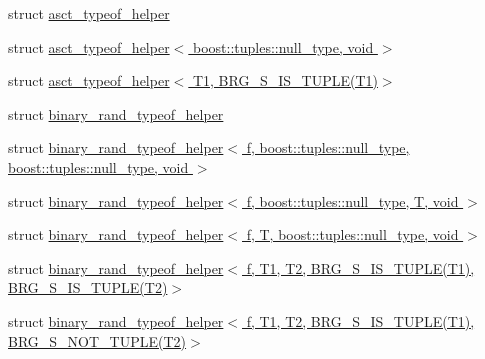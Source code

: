 \begin{DoxyCompactItemize}
\item 
struct \hyperlink{namespaceIceBRG_1_1tuples_structIceBRG_1_1tuples_1_1asct__typeof__helper}{asct\+\_\+typeof\+\_\+helper}
\item 
struct \hyperlink{namespaceIceBRG_1_1tuples_structIceBRG_1_1tuples_1_1asct__typeof__helper_3_01boost_1_1tuples_1_1null__type_00_01void_01_4}{asct\+\_\+typeof\+\_\+helper$<$ boost\+::tuples\+::null\+\_\+type, void $>$}
\item 
struct \hyperlink{namespaceIceBRG_1_1tuples_structIceBRG_1_1tuples_1_1asct__typeof__helper_3_01T1_00_01BRG__S__IS__TUPLE_07T1_08_4}{asct\+\_\+typeof\+\_\+helper$<$ T1, B\+R\+G\+\_\+\+S\+\_\+\+I\+S\+\_\+\+T\+U\+P\+L\+E(\+T1)$>$}
\item 
struct \hyperlink{namespaceIceBRG_1_1tuples_structIceBRG_1_1tuples_1_1binary__rand__typeof__helper}{binary\+\_\+rand\+\_\+typeof\+\_\+helper}
\item 
struct \hyperlink{namespaceIceBRG_1_1tuples_structIceBRG_1_1tuples_1_1binary__rand__typeof__helper_3_01f_00_01boost_1_1tuples_1_1null__type_5c02c427c306686c3b1206a9b133bf57}{binary\+\_\+rand\+\_\+typeof\+\_\+helper$<$ f, boost\+::tuples\+::null\+\_\+type, boost\+::tuples\+::null\+\_\+type, void $>$}
\item 
struct \hyperlink{namespaceIceBRG_1_1tuples_structIceBRG_1_1tuples_1_1binary__rand__typeof__helper_3_01f_00_01boost_1_1tuples_1_1null__type_00_01T_00_01void_01_4}{binary\+\_\+rand\+\_\+typeof\+\_\+helper$<$ f, boost\+::tuples\+::null\+\_\+type, T, void $>$}
\item 
struct \hyperlink{namespaceIceBRG_1_1tuples_structIceBRG_1_1tuples_1_1binary__rand__typeof__helper_3_01f_00_01T_00_01boost_1_1tuples_1_1null__type_00_01void_01_4}{binary\+\_\+rand\+\_\+typeof\+\_\+helper$<$ f, T, boost\+::tuples\+::null\+\_\+type, void $>$}
\item 
struct \hyperlink{structIceBRG_1_1tuples_1_1binary__rand__typeof__helper_3_01f_00_01T1_00_01T2_00_01BRG__S__IS__TU17fb7ccd40b5d61da5648c1c2c034d10}{binary\+\_\+rand\+\_\+typeof\+\_\+helper$<$ f, T1, T2, B\+R\+G\+\_\+\+S\+\_\+\+I\+S\+\_\+\+T\+U\+P\+L\+E(\+T1), B\+R\+G\+\_\+\+S\+\_\+\+I\+S\+\_\+\+T\+U\+P\+L\+E(\+T2)$>$}
\item 
struct \hyperlink{structIceBRG_1_1tuples_1_1binary__rand__typeof__helper_3_01f_00_01T1_00_01T2_00_01BRG__S__IS__TU0ef4e05af1a56449fbbcc207cdc65c2c}{binary\+\_\+rand\+\_\+typeof\+\_\+helper$<$ f, T1, T2, B\+R\+G\+\_\+\+S\+\_\+\+I\+S\+\_\+\+T\+U\+P\+L\+E(\+T1), B\+R\+G\+\_\+\+S\+\_\+\+N\+O\+T\+\_\+\+T\+U\+P\+L\+E(\+T2)$>$}
\item 

\end{DoxyCompactItemize}

